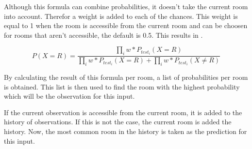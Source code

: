 Although this formula can combine probabilities, it doesn't take the current room into account. Therefor a weight is added to each of the chances. This weight is equal to 1 when the room is accessible from the current room and can be choosen for rooms that aren't accessible, the default is 0.5. This results in .

\begin{equation}
    \label{eq:combine-chances-next-level}
    P(X = R) = \frac{\prod_{i} w * P_{test_i}(X = R)}{\prod_{i} w * P_{test_i}(X = R) + \prod_{i} w * P_{test_i}(X \ne R)}
\end{equation}

By calculating the result of this formula per room, a list of probabilities per room is obtained. This list is then used to find the room with the highest probability which will be the observation for this input.

If the current observation is accessible from the current room, it is added to the history of observations. If this is not the case, the current room is added the history. Now, the most common room in the history is taken as the prediction for this input.
